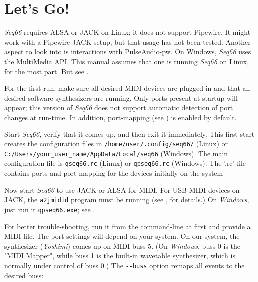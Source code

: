 %
%
%

\section{Let's Go!}
\label{sec:introduction_lets_go}

   \textsl{Seq66} requires ALSA or JACK on Linux;
   it does not support
   Pipewire.
   It might work with a Pipewire-JACK setup, but that usage has not been
   tested.
   Another aspect to look into is interactions with
   PulseAudio-pw.
   On Windows, \textsl{Seq66} uses the MultiMedia API.
   This manual assumes that one is running \textsl{Seq66} on Linux, for the
   most part.
   But see .

   For the first run, make sure all desired MIDI devices are plugged in and
   that all desired software synthesizers are running.
   Only ports present at startup will appear; this version of
   \textsl{Seq66} does not
   support automatic detection of port changes at run-time.
   In addition, port-mapping (see ) is
   enabled by default.

   Start \textsl{Seq66}, verify that it comes up, and then exit it
   immediately.
   This first start creates the configuration files in
   \texttt{/home/user/.config/seq66/} (Linux) or
   \texttt{C:/Users/your\_user\_name/AppData/Local/seq66} (Windows).
   The main configuration file is
   \texttt{qseq66.rc} (Linux) or
   \texttt{qpseq66.rc} (Windows).
   The '.rc' file contains ports and port-mapping for the devices
   initially on the system

   Now start \textsl{Seq66} to use JACK or ALSA for MIDI.
   For USB MIDI devices on JACK, the \texttt{a2jmidid} program must be running
   (see , for details.)
   On \textsl{Windows}, just run it \texttt{qpseq66.exe};
   see .

   For better trouble-shooting, run it from the command-line at first and
   provide a MIDI file.
   The port settings will depend on your system.
   On our system, the synthesizer (\textsl{Yoshimi}) comes up on MIDI buss 5.
   (On \textsl{Windows}, buss 0 is the "MIDI Mapper", while buss 1 is the
   built-in wavetable synthesizer, which is normally under control of buss 0.)
   The \texttt{-{}-buss} option remaps all events to the desired buss:

